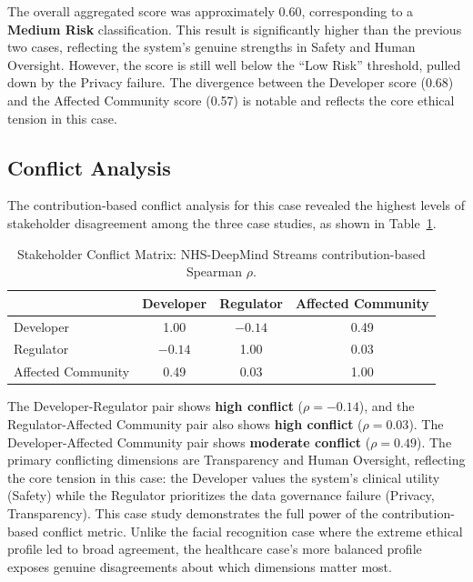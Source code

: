 The overall aggregated score was approximately 0.60, corresponding to a \textbf{Medium Risk} classification. This result is significantly higher than the previous two cases, reflecting the system's genuine strengths in Safety and Human Oversight. However, the score is still well below the \enquote{Low Risk} threshold, pulled down by the Privacy failure. The divergence between the Developer score (0.68) and the Affected Community score (0.57) is notable and reflects the core ethical tension in this case.

\subsection{Conflict Analysis}

The contribution-based conflict analysis for this case revealed the highest levels of stakeholder disagreement among the three case studies, as shown in Table~\ref{tab:cs3_conflict}.

\begin{table}[H]
\centering
\caption{Stakeholder Conflict Matrix: NHS-DeepMind Streams contribution-based Spearman $\rho$.}
\label{tab:cs3_conflict}
\begin{tabular}{@{}lccc@{}}
\toprule
 & \textbf{Developer} & \textbf{Regulator} & \textbf{Affected Community} \\
\midrule
Developer           & 1.00 & $-0.14$ &  0.49 \\
Regulator           & $-0.14$ &  1.00 &  0.03 \\
Affected Community  & 0.49 &  0.03 &  1.00 \\
\bottomrule
\end{tabular}
\end{table}

The Developer-Regulator pair shows \textbf{high conflict} ($\rho = -0.14$), and the Regulator-Affected Community pair also shows \textbf{high conflict} ($\rho = 0.03$). The Developer-Affected Community pair shows \textbf{moderate conflict} ($\rho = 0.49$). The primary conflicting dimensions are Transparency and Human Oversight, reflecting the core tension in this case: the Developer values the system's clinical utility (Safety) while the Regulator prioritizes the data governance failure (Privacy, Transparency). This case study demonstrates the full power of the contribution-based conflict metric. Unlike the facial recognition case where the extreme ethical profile led to broad agreement, the healthcare case's more balanced profile exposes genuine disagreements about which dimensions matter most.

